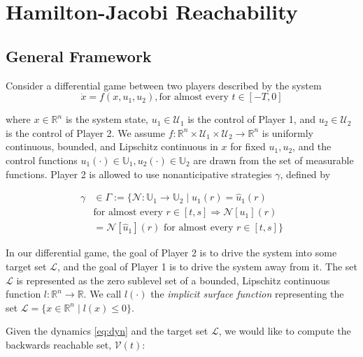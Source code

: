 \section{Hamilton-Jacobi Reachability  \label{sec:HJI}}
\subsection{General Framework}
Consider a differential game between two players described by the system
\begin{equation} \label{eq:dyn}
\dot{x} = f(x, u_1, u_2), \text{for almost every }t\in [-T,0]
\end{equation}

\noindent where $x\in\mathbb{R}^n$ is the system state, $u_1\in \mathcal{U}_1$ is the control of Player 1, and $u_2\in\mathcal{U}_2$ is the control of Player 2. We assume $f:\mathbb{R}^n\times \mathcal{U}_1 \times \mathcal{U}_2 \rightarrow \mathbb{R}^n$ is uniformly continuous, bounded, and Lipschitz continuous in $x$ for fixed $u_1,u_2$, and the control functions $u_1(\cdot)\in\mathbb{U}_1,u_2(\cdot)\in\mathbb{U}_2$ are drawn from the set of measurable functions. Player 2 is allowed to use nonanticipative strategies \cite{Evans84,Varaiya67} $\gamma$, defined by

\begin{equation}
\begin{aligned}
\gamma &\in \Gamma := \{\mathcal{N}: \mathbb{U}_1 \rightarrow \mathbb{U}_2 \mid  u_1(r) = \hat{u}_1(r) \\
&\text{for almost every } r\in[t,s] \Rightarrow \mathcal{N}[u_1](r) \\
&= \mathcal{N}[\hat{u}_1](r) \text{ for almost every } r\in[t,s]\}
\end{aligned}
\end{equation}

In our differential game, the goal of Player 2 is to drive the system into some target set $\mathcal{L}$, and the goal of Player 1 is to drive the system away from it. The set $\mathcal{L}$ is represented as the zero sublevel set of a bounded, Lipschitz continuous function $l:\mathbb{R}^n\rightarrow\mathbb{R}$. We call $l(\cdot)$ the \textit{implicit surface function} representing the set $\mathcal{L}=\{x\in\mathbb{R}^n \mid l(x)\le 0\}$.

Given the dynamics \eqref{eq:dyn} and the target set $\mathcal{L}$, we would like to compute the backwards reachable set, $\mathcal{V}(t)$:

